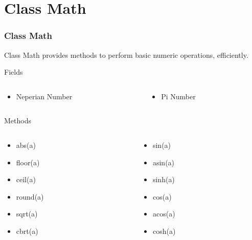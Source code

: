 \documentclass[10pt, compress]{beamer}
\begin{document}
\section{Class Math}

\begin{frame}[fragile]
  \frametitle{Class Math}
  Class Math provides methods to perform basic numeric operations, efficiently.
  \begin{block}{Fields}
    \begin{columns}
      \begin{column}{0.5\textwidth}
        \begin{itemize}
          \item[] Neperian Number
        \end{itemize}
      \end{column}
      \begin{column}{0.5\textwidth}
        \begin{itemize}
          \item[] Pi Number
        \end{itemize}
      \end{column}
    \end{columns}
  \end{block}
  \begin{block}{Methods}
    \begin{columns}
      \begin{column}{0.5\textwidth}
        \begin{itemize}
          \item[] abs(a)
          \item[] floor(a)
          \item[] ceil(a)
          \item[] round(a)
          \item[] sqrt(a)
          \item[] cbrt(a)
        \end{itemize}
      \end{column}
      \begin{column}{0.5\textwidth}
        \begin{itemize}
          \item[] sin(a)
          \item[] asin(a)
          \item[] sinh(a)
          \item[] cos(a)
          \item[] acos(a)
          \item[] cosh(a)
        \end{itemize}
      \end{column}
    \end{columns}
  \end{block}
\end{frame}
\end{document}
